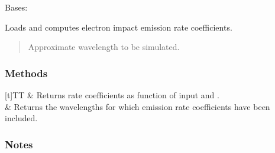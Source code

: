 \documentclass[letterpaper,10pt,english]{sphinxmanual}
\begin{document}
\begin{fulllineitems}
\label{\detokenize{nexoclom2/nexoclom2.atomicdata.eimp_emission_coef:nexoclom2.atomicdata.eimp_emission_coef.EImpEmissionCoef}}
\pysigstartsignatures
\pysiglinewithargsret
{}
{}
{}
\pysigstopsignatures
\sphinxAtStartPar
Bases: 

\sphinxAtStartPar
Loads and computes electron impact emission rate coefficients.
\begin{quote}\begin{description}
\begin{description}
\sphinxAtStartPar
Approximate wavelength to be simulated.

\end{description}

\end{description}\end{quote}
\subsubsection*{Methods}


\begin{savenotes}\sphinxattablestart
\sphinxthistablewithglobalstyle
\centering
\begin{tabulary}{\linewidth}[t]{TT}
\sphinxtoprule
\sphinxtableatstartofbodyhook
\sphinxAtStartPar
{}
&
\sphinxAtStartPar
Returns rate coefficients as function of input  and .
\\
\sphinxhline
\sphinxAtStartPar
{}
&
\sphinxAtStartPar
{} Returns the wavelengths for which emission rate coefficients have been included.
\\
\sphinxbottomrule
\end{tabulary}
\sphinxtableafterendhook\par
\sphinxattableend\end{savenotes}
\subsubsection*{Notes}


\end{fulllineitems}
\end{document}
